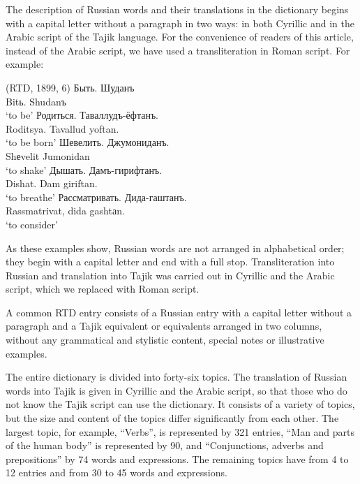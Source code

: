 \documentclass[output=paper,colorlinks,citecolor=brown,arabicfont,chinesefont]{langscibook}
\begin{document}
The description of Russian words and their translations in the dictionary begins with a capital letter without a paragraph in two ways: in both Cyrillic and in the Arabic script of the Tajik language. For the convenience of readers of this article, instead of the Arabic script, we have used a transliteration in Roman script. For example:

\ea (RTD, 1899, 6)
    \ea \gll Быть.		Шуданъ\\
             Bitь.		Shudanъ\\
        \glt `to be'
    \ex \gll    Родиться.      Таваллудъ-ёфтанъ.\\
                Roditsya.              {Tavallud yoftan.}\\
        \glt `to be born'
    \ex \gll    Шевелить.            Джумониданъ.\\
                Shеvelit            	 Jumonidan\\
        \glt `to shake' 		
    \ex \gll  Дышать.               Дамъ-гирифтанъ.\\
              Dishat.                   {Dam giriftan.}\\
        \glt `to breathe'
    \ex \gll Рассматривать.   Дида-гаштанъ.\\
             Rassmatrivat, 	{dida gashtаn.} \\
         \glt `to consider'
     \z
\z

As these examples show, Russian words are not arranged in alphabetical order; they begin with a capital letter and end with a full stop. Transliteration into Russian and translation into Tajik was carried out in Cyrillic and the Arabic script, which we replaced with Roman script.

A common RTD entry consists of a Russian entry with a capital letter without a paragraph and a Tajik equivalent or equivalents arranged in two columns, without any grammatical and stylistic content, special notes or illustrative examples.

The entire dictionary is divided into forty-six topics. The translation of Russian words into Tajik is given in Cyrillic and the Arabic script, so that those who do not know the Tajik script can use the dictionary. It consists of a variety of topics, but the size and content of the topics differ significantly from each other. The largest topic, for example, “Verbs”, is represented by 321 entries,  “Man and parts of the human body” is represented by 90, and “Conjunctions, adverbs and prepositions” by 74 words and expressions. The remaining topics have from 4 to 12 entries and from 30 to 45 words and expressions.
\end{document}
